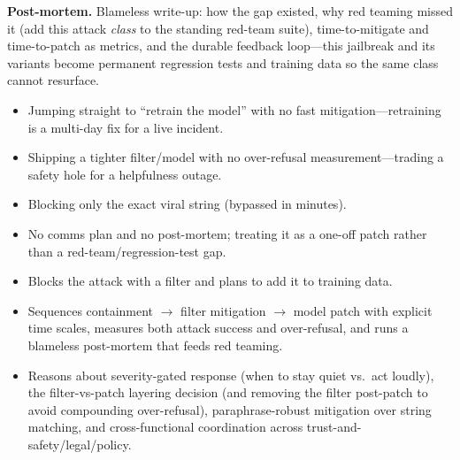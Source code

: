 \begin{interviewq}
\textbf{Post-mortem.} Blameless write-up: how the gap existed, why red teaming missed it (add this attack \textit{class} to the standing red-team suite), time-to-mitigate and time-to-patch as metrics, and the durable feedback loop---this jailbreak and its variants become permanent regression tests and training data so the same class cannot resurface.

\redflags
\begin{itemize}
    \item Jumping straight to ``retrain the model'' with no fast mitigation---retraining is a multi-day fix for a live incident.
    \item Shipping a tighter filter/model with no over-refusal measurement---trading a safety hole for a helpfulness outage.
    \item Blocking only the exact viral string (bypassed in minutes).
    \item No comms plan and no post-mortem; treating it as a one-off patch rather than a red-team/regression-test gap.
\end{itemize}


\goodgreat
\begin{itemize}
    \item {} Blocks the attack with a filter and plans to add it to training data.
    \item {} Sequences containment $\to$ filter mitigation $\to$ model patch with explicit time scales, measures both attack success and over-refusal, and runs a blameless post-mortem that feeds red teaming.
    \item {} Reasons about severity-gated response (when to stay quiet vs.\ act loudly), the filter-vs-patch layering decision (and removing the filter post-patch to avoid compounding over-refusal), paraphrase-robust mitigation over string matching, and cross-functional coordination across trust-and-safety/legal/policy.
\end{itemize}

\end{interviewq}
